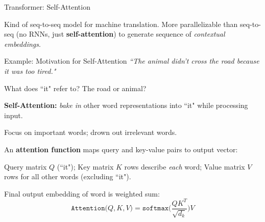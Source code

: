 \begin{frame}{Transformer: Self-Attention}
    \vspace{10pt}
    
    \begin{itemizeSpaced}{2pt}
        \item Kind of seq-to-seq model for machine translation. More parallelizable than seq-to-seq (no RNNs, just \textbf{self-attention}) to generate sequence of \textit{contextual embeddings}.
        
    \end{itemizeSpaced}
    
    \vspace{-5pt}
    \begin{exampleBlock}{Example: Motivation for Self-Attention}
    {\small \emph{``The animal didn't cross the road because it was too tired."}}\newline 
    
    What does ``it" refer to? The road or animal?
    \end{exampleBlock}
    
    \vspace{-5pt}
    \begin{itemizeSpaced}{5pt}
        \pinkbox \textbf{Self-Attention: } \emph{bake in} other word representations into ``it" while processing input. 
        
        
        \pinkbox Focus on important words; drown out irrelevant words.
        
        \item An \textbf{attention function} maps query and key-value pairs to output vector:
        
        \begin{itemizeSpaced}{5pt}
         
            \item Query matrix $Q$ (``it"); Key matrix $K$ rows describe \emph{each} word; Value matrix $V$ rows for all other words (excluding ``it"). 
            
            \item Final output embedding of word is weighted sum: 
            $$
            \texttt{Attention} \Big(Q, K, V \Big) = \texttt{softmax} \Bigg(\frac {QK^T} {\sqrt{d_k}} \Bigg) V
            $$
            
        \end{itemizeSpaced}
        \vspace{-10pt}
        
    \end{itemizeSpaced}
\end{frame}



